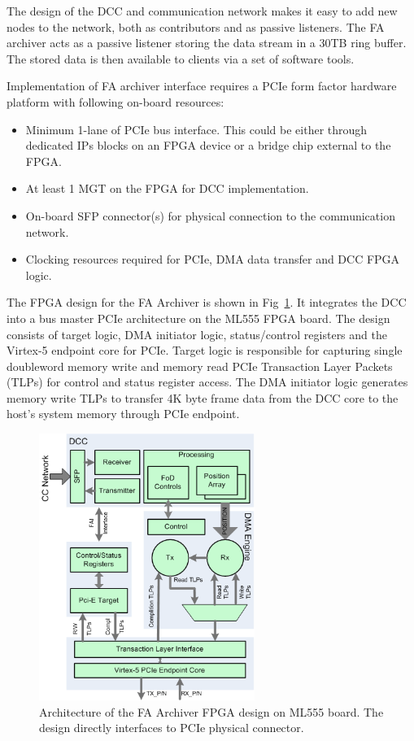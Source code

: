 \documentclass[a4paper,
              ]{jacow}
\begin{document}
The design of the DCC and communication network makes it easy to add new nodes to the network, both as contributors and as passive listeners. The FA archiver acts as a passive listener storing the data stream in a 30TB ring buffer. The stored data is then available to clients via a set of software tools.

Implementation of FA archiver interface requires a PCIe form factor hardware platform with following on-board resources:

\begin{itemize}
\setlength\itemsep{0em}
\item Minimum 1-lane of PCIe bus interface. This could be either through dedicated IPs blocks on an FPGA device or a bridge chip external to the FPGA.
\item At least 1 MGT on the FPGA for DCC implementation.
\item On-board SFP connector(s) for physical connection to the communication network.
\item Clocking resources required for PCIe, DMA data transfer and DCC FPGA logic.
\end{itemize}

The FPGA design for the FA Archiver is shown in Fig~\ref{SNIFFER}. It integrates the DCC into a bus master PCIe architecture on the ML555 FPGA board. The design consists of target logic, DMA initiator logic, status/control registers and the Virtex-5 endpoint core for PCIe. Target logic is responsible for capturing single doubleword memory write and memory read PCIe Transaction Layer Packets (TLPs) for control and status register access. The DMA initiator logic generates memory write TLPs to transfer 4K byte frame data from the DCC core to the host’s system memory through PCIe endpoint.

\begin{figure}[t!]
   \centering
   \includegraphics[width=70mm]{img/WEPGF089f4}
   \caption{Architecture of the FA Archiver FPGA design on ML555 board. The design directly interfaces to PCIe physical connector.}
   \label{SNIFFER}
\end{figure}
\end{document}
